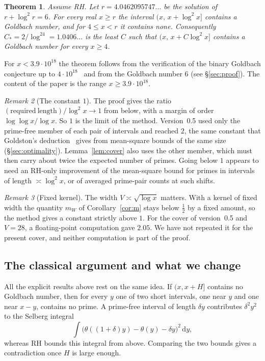 \documentclass[11pt]{amsart}
\newtheorem{theorem}{Theorem}
\theoremstyle{remark}
\newtheorem{remark}[theorem]{Remark}
\newcommand{\dd}{\,\mathrm{d}}
\begin{document}
\begin{theorem}\label{thm:main}
Assume RH. Let $r=4.0462095747\ldots$ be the solution of $r+\log^2r=6$. For every real $x\ge r$ the interval $(x,\,x+\log^2x]$ contains a Goldbach number, and for $4\le x<r$ it contains none. Consequently $C_*=2/\log^24=1.0406\ldots$ is the least $C$ such that $(x,\,x+C\log^2x]$ contains a Goldbach number for every $x\ge4$.
\end{theorem}

For $x<3.9\cdot10^{18}$ the theorem follows from the verification of the binary Goldbach conjecture up to $4\cdot10^{18}$~\cite{OHP} and from the Goldbach number $6$ (see \S\ref{sec:proof}). The content of the paper is the range $x\ge3.9\cdot10^{18}$.

\begin{remark}[The constant $1$]
The proof gives the ratio $\mathrm{(required\ length)}/\log^2x\to1$ from below, with a margin of order $\log\log x/\log x$. So $1$ is the limit of the method. Version~0.5 used only the prime-free member of each pair of intervals and reached $2$, the same constant that Goldston's deduction~\cite{Goldston} gives from mean-square bounds of the same size (\S\ref{sec:optimality}). Lemma~\ref{lem:cover} also uses the other member, which must then carry about twice the expected number of primes. Going below $1$ appears to need an RH-only improvement of the mean-square bound for primes in intervals of length $\asymp\log^2x$, or of averaged prime-pair counts at such shifts.
\end{remark}

\begin{remark}[Fixed kernel]
The width $V\asymp\sqrt{\log x}$ matters. With a kernel of fixed width the quantity $m_W$ of Corollary~\ref{cor:m} stays below $\tfrac12$ by a fixed amount, so the method gives a constant strictly above $1$. For the cover of version~0.5 and $V=28$, a floating-point computation gave $2.05$. We have not repeated it for the present cover, and neither computation is part of the proof.
\end{remark}

\subsection{The classical argument and what we change}
All the explicit results above rest on the same idea. If $(x,x+H]$ contains no Goldbach number, then for every $y$ one of two short intervals, one near $y$ and one near $x-y$, contains no prime. A prime-free interval of length $\delta y$ contributes $\delta^2y^2$ to the Selberg integral
\[
\int\big(\theta((1+\delta)y)-\theta(y)-\delta y\big)^2\dd y ,
\]
whereas RH bounds this integral from above. Comparing the two bounds gives a contradiction once $H$ is large enough.
\end{document}
